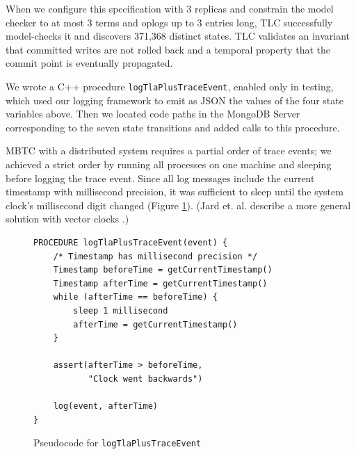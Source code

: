 \documentclass{vldb}
\begin{document}
When we configure this specification with 3 replicas and constrain the model checker to at most 3 terms and oplogs up to 3 entries long, TLC successfully model-checks it and discovers 371,368 distinct states.
TLC validates an invariant that committed writes are not rolled back and a temporal property that the commit point is eventually propagated.

We wrote a C++ procedure \texttt{logTlaPlusTraceEvent}, enabled only in testing, which used our logging framework to emit as JSON the values of the four state variables above.
Then we located code paths in the MongoDB Server corresponding to the seven state transitions and added calls to this procedure.

MBTC with a distributed system requires a partial order of trace events; we achieved a strict order by running all processes on one machine and sleeping before logging the trace event.
Since all log messages include the current timestamp with millisecond precision, it was sufficient to sleep until the system clock's millisecond digit changed (Figure \ref{fig:millisecond_sleep}). (Jard et. al. describe a more general solution with vector clocks \cite{Jard94GeneralApproachToTraceChecking}.)

\begin{figure}
\begin{verbatim}
PROCEDURE logTlaPlusTraceEvent(event) {
    /* Timestamp has millisecond precision */
    Timestamp beforeTime = getCurrentTimestamp()
    Timestamp afterTime = getCurrentTimestamp()
    while (afterTime == beforeTime) {
        sleep 1 millisecond
        afterTime = getCurrentTimestamp()
    }

    assert(afterTime > beforeTime,
           "Clock went backwards")

    log(event, afterTime)
}
\end{verbatim}
\caption{Pseudocode for \texttt{logTlaPlusTraceEvent}}
\label{fig:millisecond_sleep}
\end{figure}


\end{document}
